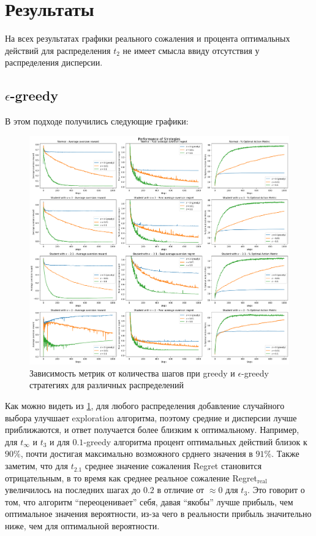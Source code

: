 \documentclass{article}
\begin{document}
\section{Результаты}

На всех результатах графики реального сожаления и процента оптимальных действий для распределения $t_2$ не имеет смысла ввиду отсутствия у распределения дисперсии.

\subsection{$\epsilon$-greedy}

В этом подходе получились следующие графики:

\begin{figure}[ht!] %
\centering
\includegraphics[width=6in]{theory_tester/theory_images/epsilon_greedy/strat_distr.png}
\caption{Зависимость метрик от количества шагов при greedy и $\epsilon$-greedy стратегиях для различных распределений}
\label{fig:epsilon_greedy_strat_distr}
\end{figure}

Как можно видеть из \ref{fig:epsilon_greedy_strat_distr}, для любого распределения добавление случайного выбора улучшает exploration алгоритма, поэтому средние и дисперсии лучше приближаются, и ответ получается более близким к оптимальному. Например, для $t_{\infty}$ и $t_3$ и для $0.1$-greedy алгоритма процент оптимальных действий близок к $90\%$, почти достигая максимально возможного срднего значения в $91\%$. Также заметим, что для $t_{2.1}$ среднее значение сожаления Regret становится отрицательным, в то время как среднее реальное сожаление Regret$_{\text{real}}$ увеличилось на последних шагах до $0.2$ в отличие от $\approx 0$ для $t_3$. Это говорит о том, что алгоритм ``переоценивает'' себя, давая ``якобы'' лучше прибыль, чем оптимальное значения вероятности, из-за чего в реальности прибыль значительно ниже, чем для оптимальной вероятности. \\
\end{document}
